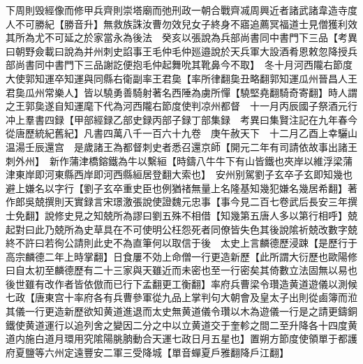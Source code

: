 下周則毁經像而修甲兵齊則崇塔廟而弛刑政一朝合戰齊㓕周興近者諸武諸韋造寺度人不可勝紀【勝音升】無救族誅汝曹勿效兒女子終身不寤追薦冥福道士見僧獲利效其所為尤不可延之於家當永為後法　癸亥以張說為兵部尚書同中書門下三品【考異曰朝野僉載曰說為并州刺史諂事王毛仲毛仲廵邉說於天兵軍大設酒肴恩敕忽降授兵部尚書同中書門下三品謝訖便抱毛仲起舞吮其靴鼻今不取】　冬十月河西隴右節度大使郭知運卒知運與同縣右衛副率王君㚟【率所律翻㚟丑略翻郭知運瓜州晉昌人王君㚟瓜州常樂人】皆以驍勇善騎射著名西陲為虜所憚【驍堅堯翻騎奇寄翻】時人謂之王郭㚟遂自知運麾下代為河西隴右節度使判凉州都督　十一月丙辰國子祭酒元行冲上羣書四録【甲部經録乙部史録丙部子録丁部集録　考異曰集賢注記在九年春今從唐歷統紀舊紀】凡書四萬八千一百六十九卷　庚午赦天下　十二月乙酉上幸驪山温湯壬辰還宫　是歲諸王為都督刺史者悉召還京師【開元二年有司請依故事出諸王刺外州】　新作蒲津橋鎔鐵為牛以繫絙【時鑄八牛牛下有山皆鐵也夾岸以維浮梁蒲津東岸即河東縣西岸即河西縣絙居登翻大索也】　安州别駕劉子玄卒子玄即知幾也避上嫌名以字行【劉子玄卒重史臣也例猶禇無量上名隆基知幾犯嫌名幾居希翻】著作郎吳兢撰則天實録言宋璟激張說使證魏元忠事【事今見二百七卷武后長安三年撰士免翻】說修史見之知兢所為謬曰劉五殊不相借【知幾第五唐人多以第行相呼】兢起對曰此乃兢所為史草具在不可使明公枉怨死者同僚皆失色其後說隂祈兢改數字兢終不許曰若徇公請則此史不為直筆何以取信于後　太史上言麟德歷浸踈【是歷行于高宗麟德二年上時掌翻】日食屢不効上命僧一行更造新歷【此所謂大衍歷也歐陽修曰自太初至麟德歷有二十三家與天雖近而未密也至一行密矣其倚數立法固無以易也後世雖有改作者皆依倣而已行下孟翻更工衡翻】率府兵曹梁令瓚造黄道遊儀以測候七政【唐東宫十率府各有兵曹參軍從九品上掌判句大朝會及皇太子出則從鹵簿而涖其儀一行更造新歷欲知黄道進退而太史無黄道儀令瓚以木為遊儀一行是之請更鑄銅鐵使黄道運行以追列舍之變因二分之中以立黄道交于奎軫之間二至升降各十四度黄道内施白道月環用究隂陽朓朒動合天運七政日月五星也】置朔方節度使領單于都護府夏鹽等六州定遠豐安二軍三受降城【單音蟬夏戶雅翻降戶江翻】

